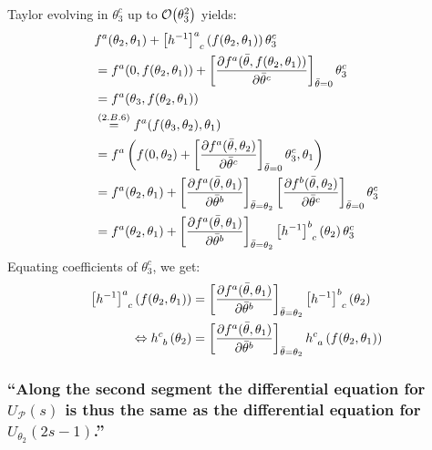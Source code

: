 \subsubsection{ }
Taylor evolving  in $\theta^c_3$ up to $\order{\theta_3^2}$ yields:
\begin{align*} 
	&f^a(\theta_2,\theta_1)+\left[h^{-1}\right]^a_{\hphantom{a}c}\left(f(\theta_2,\theta_1)\right)\theta_3^c\\
	&=f^a(0,f(\theta_2,\theta_1))+\left[\partialderivative{f^a(\bar{\theta},f(\theta_2,\theta_1))}{\bar{\theta}^c}\right]_{\bar{\theta}=0}\theta_3^c\\
	&=f^a(\theta_3,f(\theta_2,\theta_1))\\
	&\overset{\eqc{2.B.6}}{=}f^a(f(\theta_3,\theta_2),\theta_1)\\
	&=f^a\left(f(0,\theta_2)+\left[\partialderivative{f^a(\bar{\theta},\theta_2)}{\bar{\theta}^c}\right]_{\bar{\theta}=0}\theta_3^c,\theta_1\right)\\
	&=f^a(\theta_2,\theta_1)+\left[\partialderivative{f^a(\bar{\theta},\theta_1)}{\bar{\theta}^b}\right]_{\bar{\theta}=\theta_2}\left[\partialderivative{f^b(\bar{\theta},\theta_2)}{\bar{\theta}^c}\right]_{\bar{\theta}=0}\theta_3^c\\
	&=f^a(\theta_2,\theta_1)+\left[\partialderivative{f^a(\bar{\theta},\theta_1)}{\bar{\theta}^b}\right]_{\bar{\theta}=\theta_2}\left[h^{-1}\right]^b_{\hphantom{b}c}\left(\theta_2\right)\theta_3^c
\end{align*}
Equating coefficients of $\theta^c_3$, we get:
\begin{align*} 
	\left[h^{-1}\right]^a_{\hphantom{a}c}\left(f(\theta_2,\theta_1)\right)&=\left[\partialderivative{f^a(\bar{\theta},\theta_1)}{\bar{\theta}^b}\right]_{\bar{\theta}=\theta_2}\left[h^{-1}\right]^b_{\hphantom{b}c}\left(\theta_2\right)\\
	\Leftrightarrow h^c_{\hphantom{c}b}\left(\theta_2\right)&=\left[\partialderivative{f^a(\bar{\theta},\theta_1)}{\bar{\theta}^b}\right]_{\bar{\theta}=\theta_2}h^c_{\hphantom{c}a}\left(f(\theta_2,\theta_1)\right)
\end{align*}

\subsubsection{\enquote{Along the second segment the differential equation  for $U_\mathcal{P}(s)$ is thus the same as the differential equation for $U_{\theta_2}(2s-1)$.} }

